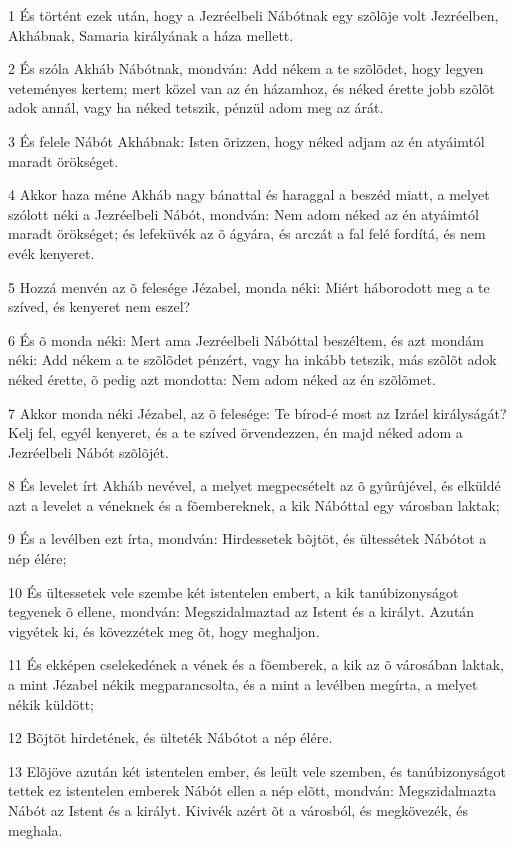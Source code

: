 \par 1 És történt ezek után, hogy a Jezréelbeli Nábótnak egy szõlõje volt Jezréelben, Akhábnak, Samaria királyának a háza mellett.
\par 2 És szóla Akháb Nábótnak, mondván: Add nékem a te szõlõdet, hogy legyen veteményes kertem; mert közel van az én házamhoz, és néked érette jobb szõlõt adok annál, vagy ha néked tetszik, pénzül adom meg az árát.
\par 3 És felele Nábót Akhábnak: Isten õrizzen, hogy néked adjam az én atyáimtól maradt örökséget.
\par 4 Akkor haza méne Akháb nagy bánattal és haraggal a beszéd miatt, a melyet szólott néki a Jezréelbeli Nábót, mondván: Nem adom néked az én atyáimtól maradt örökséget; és lefeküvék az õ ágyára, és arczát a fal felé fordítá, és nem evék kenyeret.
\par 5 Hozzá menvén az õ felesége Jézabel, monda néki: Miért háborodott meg a te szíved, és kenyeret nem eszel?
\par 6 És õ monda néki: Mert ama Jezréelbeli Nábóttal beszéltem, és azt mondám néki: Add nékem a te szõlõdet pénzért, vagy ha inkább tetszik, más szõlõt adok néked érette, õ pedig azt mondotta: Nem adom néked az én szõlõmet.
\par 7 Akkor monda néki Jézabel, az õ felesége: Te bírod-é most az Izráel királyságát? Kelj fel, egyél kenyeret, és a te szíved örvendezzen, én majd néked adom a Jezréelbeli Nábót szõlõjét.
\par 8 És levelet írt Akháb nevével, a melyet megpecsételt az õ gyûrûjével, és elküldé azt a levelet a véneknek és a fõembereknek, a kik Nábóttal egy városban laktak;
\par 9 És a levélben ezt írta, mondván: Hirdessetek bõjtöt, és ültessétek Nábótot a nép élére;
\par 10 És ültessetek vele szembe két istentelen embert, a kik tanúbizonyságot tegyenek õ ellene, mondván: Megszidalmaztad az Istent és a királyt. Azután vigyétek ki, és kövezzétek meg õt, hogy meghaljon.
\par 11 És ekképen cselekedének a vének és a fõemberek, a kik az õ városában laktak, a mint Jézabel nékik megparancsolta, és a mint a levélben megírta, a melyet nékik küldött;
\par 12 Bõjtöt hirdetének, és ülteték Nábótot a nép élére.
\par 13 Elõjöve azután két istentelen ember, és leült vele szemben, és tanúbizonyságot tettek ez istentelen emberek Nábót ellen a nép elõtt, mondván: Megszidalmazta Nábót az Istent és a királyt. Kivivék azért õt a városból, és megkövezék, és meghala.
